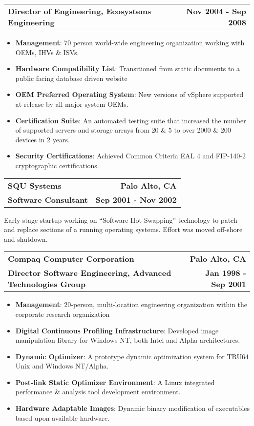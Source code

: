 \documentclass[letterpaper,10pt, sans]{article}
\makeatletter
\newcommand{\resumeCompanyHeading}[4]{
  \vspace{-1pt}
    \item
    \begin{tabular*}{1.0\textwidth}[t]{l@{\extracolsep{\fill}}r}
      \textbf{#1} & \textbf{#2} \\
      \textbf{#3} & \textbf{#4}
    \end{tabular*}\vspace{-1pt}
  }
\newcommand{\resumeCompanyPositionHeading}[2]{
    \vspace{-1pt}
      \item
      \begin{tabular*}{1.0\textwidth}{l@{\extracolsep{\fill}}r}
        \textbf{#1} & \textbf{#2}
    \end{tabular*}\vspace{-1pt}
}
\newcommand{\resumeJobDescription}[1][]{
    \vspace{-1pt}\par{#1}
}
\newcommand{\resumeItem}[2]{\item{{\textbf{#1}}: {#2 \vspace{1pt}}}}
\newcommand{\resumeItemListStart}{\begin{itemize}}\vspace{-1pt}
\newcommand{\resumeItemListEnd}{\end{itemize}}\vspace{-1pt}
\makeatother
\begin{document}
          \resumeCompanyPositionHeading 
          {Director of Engineering, Ecosystems Engineering}
          {Nov 2004 - Sep 2008}
            \resumeItemListStart
                \resumeItem{Management}{70 person world-wide engineering organization working with OEMs, IHVs \& ISVs.}
                \resumeItem{Hardware Compatibility List}{Transitioned from static documents to a public facing database driven website}
                \resumeItem{OEM Preferred Operating System}{New versions of vSphere supported at release by all major system OEMs.}
                \resumeItem{Certification Suite}{An automated testing suite that increased the number of supported servers and storage arrays
                             from 20 \& 5 to over 2000 \& 200 devices in 2 years.}
                \resumeItem{Security Certifications}{Achieved Common Criteria EAL 4 and FIP-140-2 cryptographic certifications.}
            \resumeItemListEnd
  
          \resumeCompanyHeading
            {SQU Systems}{Palo Alto, CA}
            {Software Consultant}{Sep 2001 - Nov 2002}
              \resumeJobDescription{
                Early stage startup working on “Software Hot Swapping” technology to patch and replace sections of a running operating
                systems.  Effort was moved off-shore and shutdown.}

          \resumeCompanyHeading
            {Compaq Computer Corporation}{Palo Alto, CA}
            {Director Software Engineering, Advanced Technologies Group}{Jan 1998 - Sep 2001}
            \resumeItemListStart
                \resumeItem{Management}{20-person, multi-location engineering organization within the corporate research organization}
                \resumeItem{Digital Continuous Profiling Infrastructure}{Developed image manipulation library for Windows NT, both Intel and Alpha architectures.}
                \resumeItem{Dynamic Optimizer}{A prototype dynamic optimization system for TRU64 Unix and Windows NT/Alpha.}
                \resumeItem{Post-link Static Optimizer Environment}{A Linux integrated performance \& analysis tool development environment.}
                \resumeItem{Hardware Adaptable Images}{Dynamic binary modification of executables based upon available hardware.}
            \resumeItemListEnd
\end{document}
